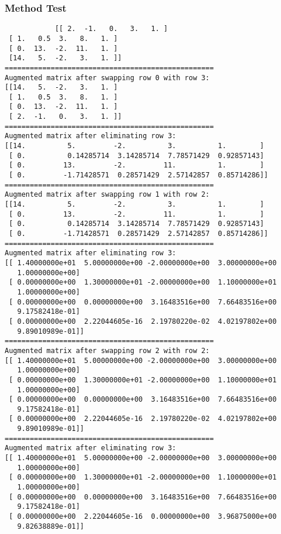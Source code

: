 \documentclass{article}
\begin{document}
        \subsubsection{Method Test}
        \begin{lstlisting}
            [[ 2.  -1.   0.   3.   1. ]
 [ 1.   0.5  3.   8.   1. ]
 [ 0.  13.  -2.  11.   1. ]
 [14.   5.  -2.   3.   1. ]]
==================================================
Augmented matrix after swapping row 0 with row 3:
[[14.   5.  -2.   3.   1. ]
 [ 1.   0.5  3.   8.   1. ]
 [ 0.  13.  -2.  11.   1. ]
 [ 2.  -1.   0.   3.   1. ]]
==================================================
Augmented matrix after eliminating row 3:
[[14.          5.         -2.          3.          1.        ]
 [ 0.          0.14285714  3.14285714  7.78571429  0.92857143]
 [ 0.         13.         -2.         11.          1.        ]
 [ 0.         -1.71428571  0.28571429  2.57142857  0.85714286]]
==================================================
Augmented matrix after swapping row 1 with row 2:
[[14.          5.         -2.          3.          1.        ]
 [ 0.         13.         -2.         11.          1.        ]
 [ 0.          0.14285714  3.14285714  7.78571429  0.92857143]
 [ 0.         -1.71428571  0.28571429  2.57142857  0.85714286]]
==================================================
Augmented matrix after eliminating row 3:
[[ 1.40000000e+01  5.00000000e+00 -2.00000000e+00  3.00000000e+00
   1.00000000e+00]
 [ 0.00000000e+00  1.30000000e+01 -2.00000000e+00  1.10000000e+01
   1.00000000e+00]
 [ 0.00000000e+00  0.00000000e+00  3.16483516e+00  7.66483516e+00
   9.17582418e-01]
 [ 0.00000000e+00  2.22044605e-16  2.19780220e-02  4.02197802e+00
   9.89010989e-01]]
==================================================
Augmented matrix after swapping row 2 with row 2:
[[ 1.40000000e+01  5.00000000e+00 -2.00000000e+00  3.00000000e+00
   1.00000000e+00]
 [ 0.00000000e+00  1.30000000e+01 -2.00000000e+00  1.10000000e+01
   1.00000000e+00]
 [ 0.00000000e+00  0.00000000e+00  3.16483516e+00  7.66483516e+00
   9.17582418e-01]
 [ 0.00000000e+00  2.22044605e-16  2.19780220e-02  4.02197802e+00
   9.89010989e-01]]
==================================================
Augmented matrix after eliminating row 3:
[[ 1.40000000e+01  5.00000000e+00 -2.00000000e+00  3.00000000e+00
   1.00000000e+00]
 [ 0.00000000e+00  1.30000000e+01 -2.00000000e+00  1.10000000e+01
   1.00000000e+00]
 [ 0.00000000e+00  0.00000000e+00  3.16483516e+00  7.66483516e+00
   9.17582418e-01]
 [ 0.00000000e+00  2.22044605e-16  0.00000000e+00  3.96875000e+00
   9.82638889e-01]]

\end{lstlisting}
\end{document}
